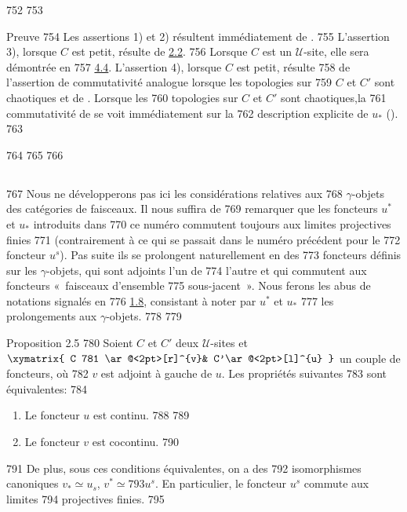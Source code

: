    752	
   753	\begin{enonce*}[remark]{Preuve}
   754	Les assertions 1) et 2) résultent immédiatement de .
   755	L'assertion 3), lorsque $C$ est petit, résulte de \hyperref[III.prop2.2]{2.2}.
   756	Lorsque $C$ est un $𝒰$-site, elle sera démontrée en
   757	\hyperref[III.subsec4.4]{4.4}. L'assertion 4), lorsque $C$ est petit, résulte
   758	de l'assertion de commutativité analogue lorsque les topologies sur
   759	$C$ et $C'$ sont chaotiques et de . Lorsque les
   760	topologies sur $C$ et $C'$ sont chaotiques,\pageoriginale la
   761	commutativité de  se voit immédiatement sur la
   762	description explicite de $u_{\ast}$ ().
   763	\end{enonce*}
   764	
   765	\setcounter{subsection}{3}
   766	\subsection{}
   767	Nous ne développerons pas ici les considérations relatives aux
   768	$\gamma$-objets des catégories de faisceaux. Il nous suffira de
   769	remarquer que les foncteurs $u^{\ast}$ et $u_{\ast}$ introduits dans
   770	ce numéro commutent toujours aux limites projectives finies
   771	(contrairement à ce qui se passait dans le numéro précédent pour le
   772	foncteur $u^s$). Pas suite ils se prolongent naturellement en des
   773	foncteurs définis sur les $\gamma$-objets, qui sont adjoints l'un de
   774	l'autre et qui commutent aux foncteurs « faisceaux d'ensemble
   775	sous-jacent ». Nous ferons les abus de notations signalés en
   776	\hyperref[III.not1.8]{1.8}, consistant à noter par $u^{\ast}$ et $u_{\ast}$
   777	les prolongements aux $\gamma$-objets.
   778	
   779	\begin{enonce*}{Proposition 2.5}
   780	Soient $C$ et $C'$ deux $𝒰$-sites et $\xymatrix{ C
   781	\ar@<2pt>[r]^{v}& C'\ar@<2pt>[l]^{u} }$ un couple de foncteurs, où
   782	$v$ est adjoint à gauche de $u$. Les propriétés suivantes
   783	sont équivalentes:
   784	\begin{enumerate}
   785	\renewcommand{\theenumi}{\roman{enumi}}
   786	\renewcommand{\labelenumi}{\theenumi)}
   787	\item Le foncteur $u$ est continu.
   788	
   789	\item Le foncteur $v$ est cocontinu.
   790	\end{enumerate}
   791	De plus, sous ces conditions équivalentes, on a des
   792	isomorphismes canoniques $v_{\ast}\simeq u_{s}$, $v^{\ast}\simeq
   793	u^s$. En particulier, le foncteur $u^s$ commute aux limites
   794	projectives finies.
   795	\end{enonce*}

